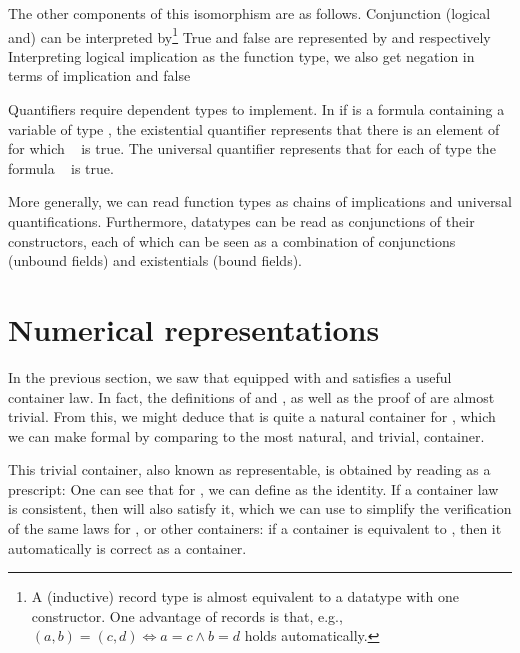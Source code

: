 The other components of this isomorphism are as follows. Conjunction (logical and) can be interpreted by\footnote{A (inductive) record type is almost equivalent to a datatype with one constructor. One advantage of records is that, e.g., $(a, b) = (c , d) \iff a = c \land b = d$ holds automatically.}
True and false are represented by
and respectively
Interpreting logical implication as the function type, we also get negation in terms of implication and false

Quantifiers require dependent types to implement. In
if  is a formula containing a variable of type , the existential quantifier represents that there is an element  of  for which \  is true. The universal quantifier
represents that for each  of type  the formula \  is true.

More generally, we can read function types as chains of implications and universal quantifications. Furthermore, datatypes can be read as conjunctions of their constructors, each of which can be seen as a combination of conjunctions (unbound fields) and existentials (bound fields). 


\section{Numerical representations}\label{sec:background-numerical}
In the previous section, we saw that  equipped with  and  satisfies a useful container law. In fact, the definitions of  and , as well as the proof of  are almost trivial. From this, we might deduce that  is quite a natural container for \bN{}, which we can make formal by comparing  to the most natural, and trivial, container.

This trivial container, also known as representable, is obtained by reading  as a prescript:
One can see that for , we can define  as the identity. If a container law is consistent, then  will also satisfy it, which we can use to simplify the verification of the same laws for , or other containers: if a container is equivalent to , then it automatically is correct as a container.

